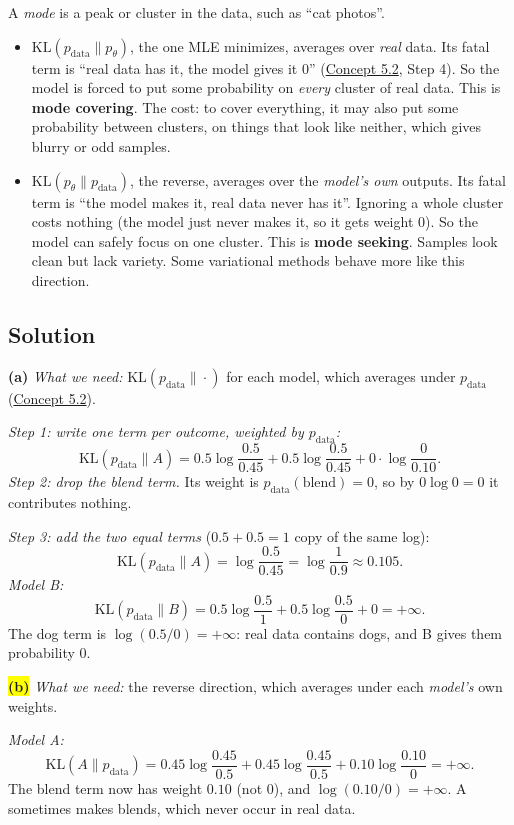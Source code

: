 \documentclass[12pt,a4paper]{article}
\begin{document}
A \emph{mode} is a peak or cluster in the data, such as ``cat photos''.
\begin{itemize}[nosep]
  \item $\mathrm{KL}(p_{\text{data}}\|p_\theta)$, the one MLE minimizes, averages over \emph{real} data. Its fatal term is ``real data has it, the model gives it 0'' (\hyperref[c5-2]{Concept 5.2}, Step 4). So the model is forced to put some probability on \emph{every} cluster of real data. This is \textbf{mode covering}. The cost: to cover everything, it may also put some probability between clusters, on things that look like neither, which gives blurry or odd samples.
  \item $\mathrm{KL}(p_\theta\|p_{\text{data}})$, the reverse, averages over the \emph{model's own} outputs. Its fatal term is ``the model makes it, real data never has it''. Ignoring a whole cluster costs nothing (the model just never makes it, so it gets weight 0). So the model can safely focus on one cluster. This is \textbf{mode seeking}. Samples look clean but lack variety. Some variational methods behave more like this direction.
\end{itemize}

\subsection{Solution}

\textbf{(a)} \emph{What we need:} $\mathrm{KL}(p_{\text{data}}\|\cdot)$ for each model, which averages under $p_{\text{data}}$ (\hyperref[c5-2]{Concept 5.2}).

\emph{Step 1: write one term per outcome, weighted by $p_{\text{data}}$:}
\[
\mathrm{KL}(p_{\text{data}}\|A)=0.5\log\frac{0.5}{0.45}+0.5\log\frac{0.5}{0.45}+0\cdot\log\frac{0}{0.10}.
\]
\emph{Step 2: drop the blend term.} Its weight is $p_{\text{data}}(\text{blend})=0$, so by $0\log0=0$ it contributes nothing.

\emph{Step 3: add the two equal terms} ($0.5+0.5=1$ copy of the same log):
\[
\mathrm{KL}(p_{\text{data}}\|A)=\log\frac{0.5}{0.45}=\log\frac{1}{0.9}\approx0.105 .
\]
\emph{Model B:}
\[
\mathrm{KL}(p_{\text{data}}\|B)=0.5\log\frac{0.5}{1}+0.5\log\frac{0.5}{0}+0=+\infty .
\]
The dog term is $\log(0.5/0)=+\infty$: real data contains dogs, and B gives them probability 0.

\colorbox{yellow}{\textbf{(b)}} \emph{What we need:} the reverse direction, which averages under each \emph{model's} own weights.

\emph{Model A:}
\[
\mathrm{KL}(A\|p_{\text{data}})=0.45\log\frac{0.45}{0.5}+0.45\log\frac{0.45}{0.5}+0.10\log\frac{0.10}{0}=+\infty .
\]
The blend term now has weight $0.10$ (not 0), and $\log(0.10/0)=+\infty$. A sometimes makes blends, which never occur in real data.
\end{document}
